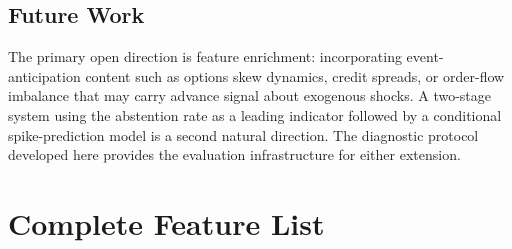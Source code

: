 \documentclass[12pt]{article}
\begin{document}
\subsection*{Future Work}

The primary open direction is feature enrichment: incorporating event-anticipation content such as options skew dynamics, credit spreads, or order-flow imbalance that may carry advance signal about exogenous shocks. A two-stage system using the abstention rate as a leading indicator followed by a conditional spike-prediction model is a second natural direction. The diagnostic protocol developed here provides the evaluation infrastructure for either extension.

\appendix
\section{Complete Feature List}
\label{app:features}
\end{document}
